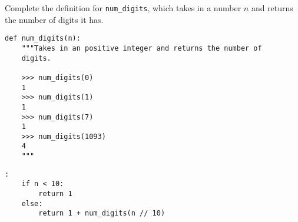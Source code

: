 \begin{blocksection}
\question Complete the definition for \texttt{num\_digits}, which takes in a number $n$ and returns the number of digits it has.

\begin{lstlisting}
def num_digits(n):
    """Takes in an positive integer and returns the number of
    digits.

    >>> num_digits(0)
    1
    >>> num_digits(1)
    1
    >>> num_digits(7)
    1
    >>> num_digits(1093)
    4
    """
\end{lstlisting}

\begin{solution}[1in]
\begin{lstlisting}:
    if n < 10:
        return 1
    else:
        return 1 + num_digits(n // 10)
\end{lstlisting}
\end{solution}
\end{blocksection}
